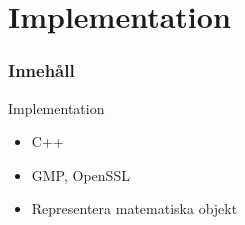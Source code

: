 \section{Implementation}
\begin{frame}
\frametitle{Innehåll}
\tableofcontents[currentsection]
\end{frame}

\begin{frame}{Implementation}


\begin{itemize}
\item C++
\item GMP, OpenSSL
\item Representera matematiska objekt
\end{itemize}

\begin{center}
\end{center}

\end{frame}
